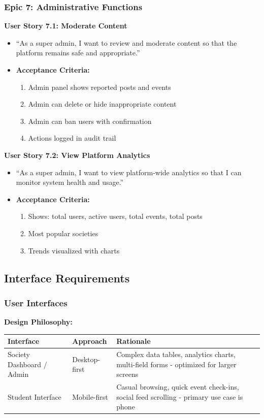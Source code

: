 \documentclass[12pt,a4paper]{article}
\begin{document}
\subsubsection{Epic 7: Administrative Functions}

\textbf{User Story 7.1: Moderate Content}
\begin{itemize}
    \item ``As a super admin, I want to review and moderate content so that the platform remains safe and appropriate.''
    \item \textbf{Acceptance Criteria:}
    \begin{enumerate}
        \item Admin panel shows reported posts and events
        \item Admin can delete or hide inappropriate content
        \item Admin can ban users with confirmation
        \item Actions logged in audit trail
    \end{enumerate}
\end{itemize}

\textbf{User Story 7.2: View Platform Analytics}
\begin{itemize}
    \item ``As a super admin, I want to view platform-wide analytics so that I can monitor system health and usage.''
    \item \textbf{Acceptance Criteria:}
    \begin{enumerate}
        \item Shows: total users, active users, total events, total posts
        \item Most popular societies
        \item Trends visualized with charts
    \end{enumerate}
\end{itemize}

\subsection{Interface Requirements}

\subsubsection{User Interfaces}

\textbf{Design Philosophy:}

\begin{table}[h]
\centering
\begin{tabular}{|p{4cm}|p{3cm}|p{7cm}|}
\hline
\textbf{Interface} & \textbf{Approach} & \textbf{Rationale} \\
\hline
Society Dashboard / Admin & Desktop-first & Complex data tables, analytics charts, multi-field forms - optimized for larger screens \\
\hline
Student Interface & Mobile-first & Casual browsing, quick event check-ins, social feed scrolling - primary use case is phone \\
\hline
\end{tabular}
\end{table}
\end{document}
